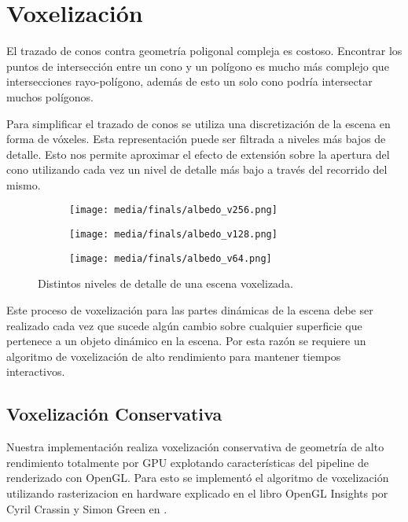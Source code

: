 \section{Voxelización} %
\label{sec:voxelizacion}
El trazado de conos contra geometría poligonal compleja es costoso. Encontrar los puntos de intersección entre un cono y un polígono es mucho más complejo que intersecciones rayo-polígono, además de esto un solo cono podría intersectar muchos polígonos.

Para simplificar el trazado de conos se utiliza una discretización de la escena en forma de vóxeles. Esta representación puede ser filtrada a niveles más bajos de detalle. Esto nos permite aproximar el efecto de extensión sobre la apertura del cono utilizando cada vez un nivel de detalle más bajo a través del recorrido del mismo.

\begin{figure}[H]
	\centering
	\begin{subfigure}[b]{.32\linewidth}
		\centering
		\captionsetup{justification=centering}
		\texttt{[image: media/finals/albedo\_v256.png]}
	\end{subfigure}%
	\hspace{0.01\textwidth}
	\begin{subfigure}[b]{.32\linewidth}
		\centering
		\captionsetup{justification=centering}
		\texttt{[image: media/finals/albedo\_v128.png]}
	\end{subfigure}%
	\hspace{0.01\textwidth}
	\begin{subfigure}[b]{.32\linewidth}
		\centering
		\captionsetup{justification=centering}
		\texttt{[image: media/finals/albedo\_v64.png]}
	\end{subfigure}%
	\caption{Distintos niveles de detalle de una escena voxelizada.}
	\label{fig:voxelization_details}
\end{figure}

Este proceso de voxelización para las partes dinámicas de la escena debe ser realizado cada vez que sucede algún cambio sobre cualquier superficie que pertenece a un objeto dinámico en la escena. Por esta razón se requiere un algoritmo de voxelización de alto rendimiento para mantener tiempos interactivos.

\subsection{Voxelización Conservativa} %
\label{sub:voxelizacion_conservativa}
Nuestra implementación realiza voxelización conservativa de geometría de alto rendimiento totalmente por \ac{GPU} explotando características del pipeline de renderizado con OpenGL. Para esto se implementó el algoritmo de voxelización utilizando rasterizacion en hardware explicado en el libro OpenGL Insights por Cyril Crassin y Simon Green en  \cite{CozziRiccio12}. 


